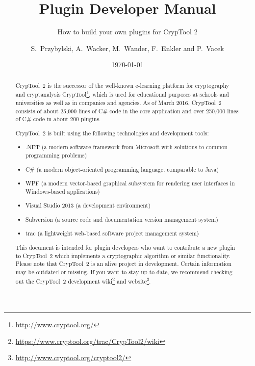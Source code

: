 \documentclass[11pt, a4paper, titlepage, appendixprefix]{scrreprt}
\title{Plugin Developer Manual}
\subtitle{How to build your own plugins for CrypTool 2}
\author{S.\ Przybylski, A.\ Wacker, M.\ Wander, F.\ Enkler and P.\ Vacek}
\date{\today}
\makeatletter
\newcommand\WaterMarkPic{%
    \setlength{\@tempdimb}{1.85cm}%
    \setlength{\@tempdimc}{2.7cm}%
    \setlength{\unitlength}{1pt}%
    \put(\strip@pt\@tempdimb,\strip@pt\@tempdimc){
            \texttt{[image: figures/ct\_logo\_watermark]}%
    }
}
\makeatother
\begin{document}
	\maketitle

	\begin{abstract}
CrypTool~2 is the successor of the well-known e-learning platform for cryptography and cryptanalysis CrypTool\footnote{\url{http://www.cryptool.org/}}, which is used for educational purposes at schools and universities as well as in companies and agencies. As of March 2016, CrypTool~2 consists of about 25,000 lines of C\# code in the core application and over 250,000 lines of C\# code in about 200 plugins.

CrypTool~2 is built using the following technologies and development tools:

\begin{itemize}
	\item .NET (a modern software framework from Microsoft with solutions to common programming problems)
	\item C\# (a modern object-oriented programming language, comparable to Java)
  \item WPF (a modern vector-based graphical subsystem for rendering user interfaces in Windows-based applications)
  \item Visual Studio 2013 (a development environment)
	\item Subversion (a source code and documentation version management system)
	\item trac (a lightweight web-based software project management system)
\end{itemize}

This document is intended for plugin developers who want to contribute a new plugin to CrypTool~2 which implements a cryptographic algorithm or similar functionality. Please note that CrypTool~2 is an alive project in development. Certain information may be outdated or missing. If you want to stay up-to-date, we recommend checking out the CrypTool~2 development wiki\footnote{\url{https://www.cryptool.org/trac/CrypTool2/wiki}} and website\footnote{\url{http://www.cryptool.org/cryptool2/}}.
    \end{abstract}

	\tableofcontents
    \listoffigures


	
	
	
\end{document}
